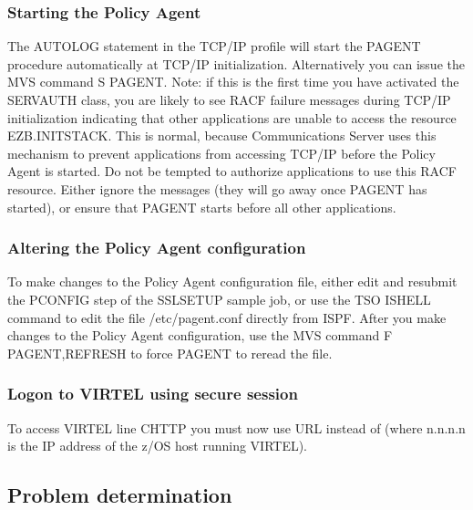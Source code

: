 \documentclass[letterpaper,10pt,english]{sphinxmanual}
\begin{document}
\subsubsection{Starting the Policy Agent}
\label{\detokenize{Customization:starting-the-policy-agent}}
\sphinxAtStartPar
The AUTOLOG statement in the TCP/IP profile will start the PAGENT procedure automatically at TCP/IP initialization. Alternatively you can issue the MVS command S PAGENT.
Note: if this is the first time you have activated the SERVAUTH class, you are likely to see RACF failure messages during TCP/IP initialization indicating that other applications are unable to access the resource EZB.INITSTACK. This is normal, because Communications Server uses this mechanism to prevent applications from accessing TCP/IP before the Policy
Agent is started. Do not be tempted to authorize applications to use this RACF resource. Either ignore the messages (they will go away once PAGENT has started), or ensure that PAGENT starts before all other applications.


\subsubsection{Altering the Policy Agent configuration}
\label{\detokenize{Customization:altering-the-policy-agent-configuration}}
\sphinxAtStartPar
To make changes to the Policy Agent configuration file, either edit and resubmit the PCONFIG step of the SSLSETUP sample job, or use the TSO ISHELL command to edit the file /etc/pagent.conf directly from ISPF. After you make changes to the Policy Agent configuration, use the MVS command F PAGENT,REFRESH to force PAGENT to reread the file.


\subsubsection{Logon to VIRTEL using secure session}
\label{\detokenize{Customization:logon-to-virtel-using-secure-session}}
\sphinxAtStartPar
To access VIRTEL line C\sphinxhyphen{}HTTP you must now use URL  instead of  (where n.n.n.n is the IP address of the z/OS host running VIRTEL).


\subsection{Problem determination}
\label{\detokenize{Customization:problem-determination}}
\end{document}
